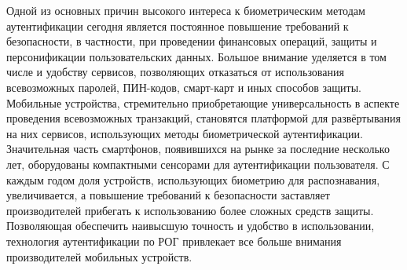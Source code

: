 Одной из основных причин высокого интереса к биометрическим методам аутентификации сегодня является постоянное повышение требований к безопасности, в частности, при проведении финансовых операций, защиты и персонификации пользовательских данных. Большое внимание уделяется в том числе и удобству сервисов, позволяющих отказаться от использования всевозможных паролей, ПИН-кодов, смарт-карт и иных способов защиты. Мобильные устройства, стремительно приобретающие универсальность в аспекте проведения всевозможных транзакций, становятся платформой для развёртывания на них сервисов, использующих методы биометрической аутентификации. Значительная часть смартфонов, появившихся на рынке за последние несколько лет, оборудованы компактными сенсорами для аутентификации пользователя. С каждым годом доля устройств, использующих биометрию для распознавания, увеличивается, а повышение требований к безопасности заставляет производителей прибегать к использованию более сложных средств защиты. Позволяющая обеспечить наивысшую точность и удобство в использовании, технология аутентификации по РОГ привлекает все больше внимания производителей мобильных устройств.

\actualitysection
\actualitytext

\objectivesection
\objectivetext

\noveltysection
\noveltytext

{}

\resultssection
\resultstext

\approbationsection
\approbationtext

\pubsection
\pubtext

\contribsection
\contribtext

\structsection
\structtext
